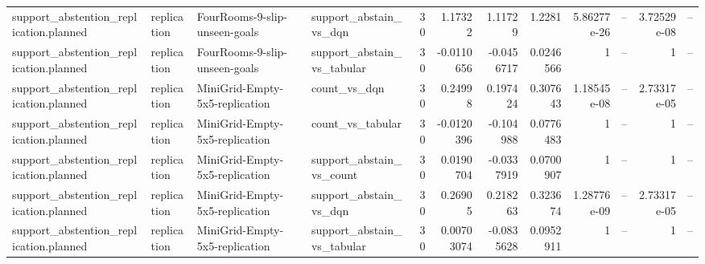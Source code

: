 \begin{longtable}{llllrrrrrrrr}
support\_abstention\_replication.planned & replication & FourRooms-9-slip-unseen-goals & support\_abstain\_vs\_dqn & 30 & 1.17322 & 1.11729 & 1.2281 & 5.86277e-26 & -- & 3.72529e-08 & -- \\
support\_abstention\_replication.planned & replication & FourRooms-9-slip-unseen-goals & support\_abstain\_vs\_tabular & 30 & -0.0110656 & -0.0456717 & 0.0246566 & 1 & -- & 1 & -- \\
support\_abstention\_replication.planned & replication & MiniGrid-Empty-5x5-replication & count\_vs\_dqn & 30 & 0.24998 & 0.197424 & 0.307643 & 1.18545e-08 & -- & 2.73317e-05 & -- \\
support\_abstention\_replication.planned & replication & MiniGrid-Empty-5x5-replication & count\_vs\_tabular & 30 & -0.0120396 & -0.104988 & 0.0776483 & 1 & -- & 1 & -- \\
support\_abstention\_replication.planned & replication & MiniGrid-Empty-5x5-replication & support\_abstain\_vs\_count & 30 & 0.0190704 & -0.0337919 & 0.0700907 & 1 & -- & 1 & -- \\
support\_abstention\_replication.planned & replication & MiniGrid-Empty-5x5-replication & support\_abstain\_vs\_dqn & 30 & 0.26905 & 0.218263 & 0.323674 & 1.28776e-09 & -- & 2.73317e-05 & -- \\
support\_abstention\_replication.planned & replication & MiniGrid-Empty-5x5-replication & support\_abstain\_vs\_tabular & 30 & 0.00703074 & -0.0835628 & 0.0952911 & 1 & -- & 1 & -- \\
\end{longtable}
